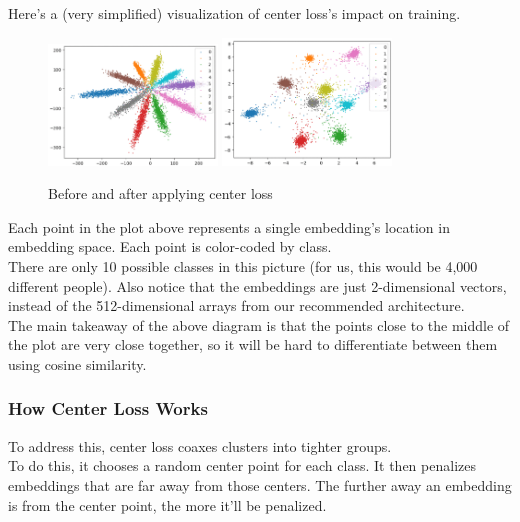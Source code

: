 \documentclass{article}
\begin{document}
Here's a (very simplified) visualization of center loss's impact on training. \\

\begin{figure}[h]
\centering
\includegraphics[width=0.4\textwidth]{images/softmax.png}
\includegraphics[width=0.4\textwidth]{images/centerloss.png}
\caption{Before and after applying center loss}
\end{figure}

Each point in the plot above represents a single embedding's location in embedding space. Each point is color-coded by class. \\

There are only 10 possible classes in this picture (for us, this would be 4,000 different people). Also notice that the embeddings are just 2-dimensional vectors, instead of the 512-dimensional arrays from our recommended architecture. \\

The main takeaway of the above diagram is that the points close to the middle of the plot are very close together, so it will be hard to differentiate between them using cosine similarity.

\subsubsection{How Center Loss Works}

To address this, center loss coaxes clusters into tighter groups. \\

To do this, it chooses a random center point for each class. It then penalizes embeddings that are far away from those centers. The further away an embedding is from the center point, the more it'll be penalized. 
\end{document}
